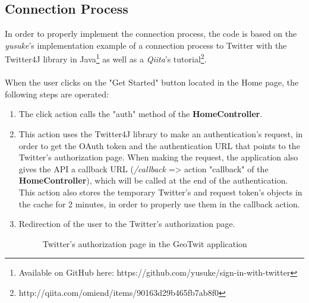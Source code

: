 \documentclass[a4paper,11pt]{report}
\begin{document}
\subsection{Connection Process}
In order to properly implement the connection process, the code is based on the \emph{yusuke}'s implementation example of a connection process to Twitter with the Twitter4J library in Java\footnote{Available on GitHub here: https://github.com/yusuke/sign-in-with-twitter} as well as a \emph{Qiita}'s tutorial\footnote{http://qiita.com/omiend/items/90163d29b465fb7ab8f0}.\\\\
When the user clicks on the "Get Started" button located in the Home page, the following steps are operated:
\begin{enumerate}
	\item The click action calls the "auth" method of the \textbf{HomeController}.
	\item This action uses the Twitter4J library to make an authentication's request, in order to get the OAuth token and the authentication URL that points to the Twitter's authorization page. When making the request, the application also gives the API a callback URL (\emph{/callback} => action "callback" of the \textbf{HomeController}), which will be called at the end of the authentication. This action also stores the temporary Twitter's and request token's objects in the cache for 2 minutes, in order to properly use them in the callback action.
	\item Redirection of the user to the Twitter's authorization page.
	\begin{figure}[H]
	\vspace{-5pt}
	\begin{center}
	\vspace{-5pt}
	\caption{Twitter's authorization page in the GeoTwit application}
	\end{center}
	\end{figure}
	\vspace{-20pt}

\end{enumerate}
\end{document}
